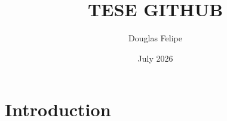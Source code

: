 \documentclass{article}
\title{TESE GITHUB}
\author{Douglas Felipe}
\date{July 2026}
\begin{document}
\maketitle

\section{Introduction}
\end{document}
